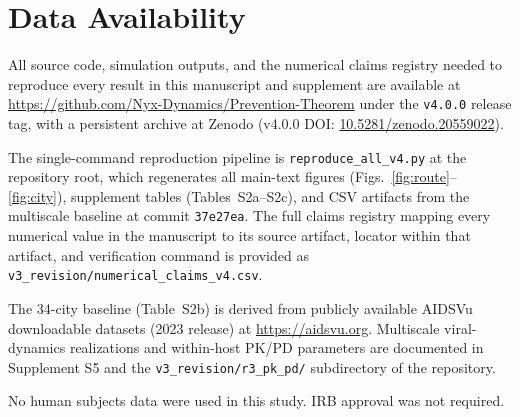 \documentclass[10pt,letterpaper]{article}
\theoremstyle{definition}
\theoremstyle{remark}
\begin{document}

\section*{Data Availability}

All source code, simulation outputs, and the numerical claims registry
needed to reproduce every result in this manuscript and supplement are
available at \url{https://github.com/Nyx-Dynamics/Prevention-Theorem}
under the \texttt{v4.0.0} release tag, with a persistent archive at
Zenodo (v4.0.0 DOI: \href{https://doi.org/10.5281/zenodo.20559022}{10.5281/zenodo.20559022}).

The single-command reproduction pipeline is \texttt{reproduce\_all\_v4.py}
at the repository root, which regenerates all main-text figures
(Figs.~\ref{fig:route}--\ref{fig:city}), supplement tables
(Tables~S2a--S2c), and CSV
artifacts from the multiscale baseline at commit \texttt{37e27ea}. The
full claims registry mapping every numerical value in the manuscript
to its source artifact, locator within that artifact, and verification
command is provided as \texttt{v3\_revision/numerical\_claims\_v4.csv}.

The 34-city baseline (Table~S2b) is derived from
publicly available AIDSVu downloadable datasets (2023 release) at
\url{https://aidsvu.org}. Multiscale viral-dynamics realizations and
within-host PK/PD parameters are documented in Supplement S5 and the
\texttt{v3\_revision/r3\_pk\_pd/} subdirectory of the repository.

No human subjects data were used in this study. IRB approval was not
required.

\renewcommand{\refname}{\large\textbf{References and Notes}}
\end{document}
